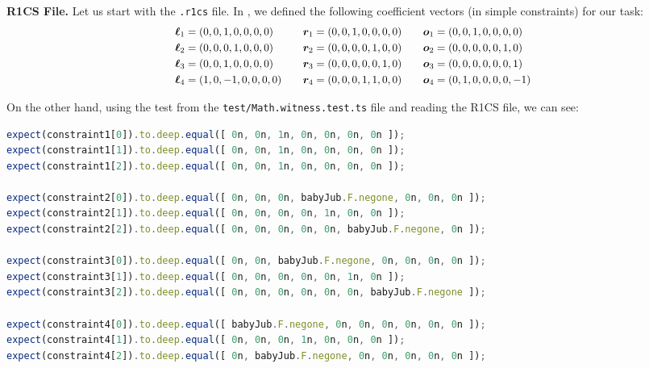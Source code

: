 \documentclass[../../book.tex]{subfiles}
\begin{document}
\textbf{R1CS File.} Let us start with the \texttt{.r1cs} file. In ,
we defined the following coefficient vectors (in simple constraints) for our
task:
\begin{equation*}
    \scalebox{0.95}{$
    \begin{aligned}
        \boldsymbol{\ell}_1 &= (0, 0, 1, 0, 0, 0, 0) & \quad \boldsymbol{r}_1 &= (0, 0, 1, 0, 0, 0, 0) & \quad \boldsymbol{o}_1 &= (0, 0, 1, 0, 0, 0, 0) \\
        \boldsymbol{\ell}_2 &= (0, 0, 0, 1, 0, 0, 0) & \quad \boldsymbol{r}_2 &= (0, 0, 0, 0, 1, 0, 0) & \quad \boldsymbol{o}_2 &= (0, 0, 0, 0, 0, 1, 0) \\
        \boldsymbol{\ell}_3 &= (0, 0, 1, 0, 0, 0, 0) & \quad \boldsymbol{r}_3 &= (0, 0, 0, 0, 0, 1, 0) & \quad \boldsymbol{o}_3 &= (0, 0, 0, 0, 0, 0, 1) \\
        \boldsymbol{\ell}_4 &= (1, 0, -1, 0, 0, 0, 0) & \quad \boldsymbol{r}_4 &= (0, 0, 0, 1, 1, 0, 0) & \quad \boldsymbol{o}_4 &= (0, 1, 0, 0, 0, 0, -1)
    \end{aligned}
    $}
\end{equation*}

On the other hand, using the test from the \texttt{test/Math.witness.test.ts} file and reading the R1CS file, we can see:

\begin{center}
    \begin{tcolorbox}[enhanced,
        width=1.0\textwidth,
        title={\textbf{test/Math.witness.test.ts}},
        coltitle=gray!25!black,
        attach boxed title to top center={yshift=-2mm,yshifttext=-1mm},
        boxed title style={size=small,colframe=gray!75!black,
        colback=Green!30!white,boxrule=1.5pt},
        top=-0.3cm,
        bottom=-0.3cm]
        \begin{lstlisting}[language=TypeScript,numbers=none,basicstyle=\scriptsize\ttfamily\scriptsize]
expect(constraint1[0]).to.deep.equal([ 0n, 0n, 1n, 0n, 0n, 0n, 0n ]);
expect(constraint1[1]).to.deep.equal([ 0n, 0n, 1n, 0n, 0n, 0n, 0n ]);
expect(constraint1[2]).to.deep.equal([ 0n, 0n, 1n, 0n, 0n, 0n, 0n ]);

expect(constraint2[0]).to.deep.equal([ 0n, 0n, 0n, babyJub.F.negone, 0n, 0n, 0n ]);
expect(constraint2[1]).to.deep.equal([ 0n, 0n, 0n, 0n, 1n, 0n, 0n ]);
expect(constraint2[2]).to.deep.equal([ 0n, 0n, 0n, 0n, 0n, babyJub.F.negone, 0n ]);

expect(constraint3[0]).to.deep.equal([ 0n, 0n, babyJub.F.negone, 0n, 0n, 0n, 0n ]);
expect(constraint3[1]).to.deep.equal([ 0n, 0n, 0n, 0n, 0n, 1n, 0n ]);
expect(constraint3[2]).to.deep.equal([ 0n, 0n, 0n, 0n, 0n, 0n, babyJub.F.negone ]);

expect(constraint4[0]).to.deep.equal([ babyJub.F.negone, 0n, 0n, 0n, 0n, 0n, 0n ]);
expect(constraint4[1]).to.deep.equal([ 0n, 0n, 0n, 1n, 0n, 0n, 0n ]);
expect(constraint4[2]).to.deep.equal([ 0n, babyJub.F.negone, 0n, 0n, 0n, 0n, 0n ]);
        \end{lstlisting}
    \end{tcolorbox}
\end{center}
\end{document}
